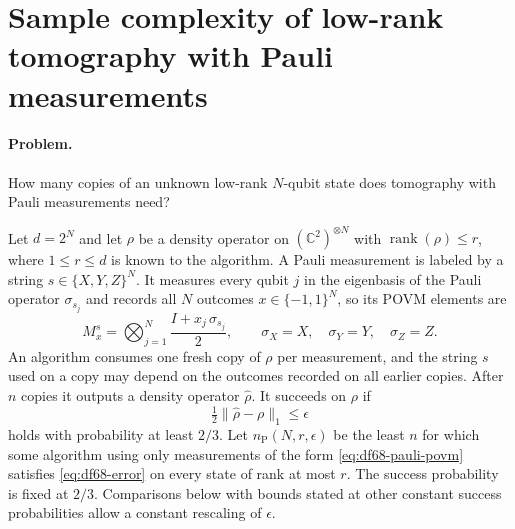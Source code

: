 \section{Sample complexity of low-rank tomography with Pauli measurements}
\label{sec:op_df689759a5203415}

\paragraph{Problem.}
How many copies of an unknown low-rank $N$-qubit state does tomography with Pauli measurements need?

Let $d=2^N$ and let $\rho$ be a density operator on $(\mathbb{C}^2)^{\otimes N}$ with $\operatorname{rank}(\rho)\leq r$, where $1\leq r\leq d$ is known to the algorithm. A Pauli measurement is labeled by a string $s\in\{X,Y,Z\}^N$. It measures every qubit $j$ in the eigenbasis of the Pauli operator $\sigma_{s_j}$ and records all $N$ outcomes $x\in\{-1,1\}^N$, so its POVM elements are
\begin{equation}
  M^{s}_{x}=\bigotimes_{j=1}^{N}\frac{I+x_j\,\sigma_{s_j}}{2},
  \qquad
  \sigma_X=X,\quad\sigma_Y=Y,\quad\sigma_Z=Z.
  \label{eq:df68-pauli-povm}
\end{equation}
An algorithm consumes one fresh copy of $\rho$ per measurement, and the string $s$ used on a copy may depend on the outcomes recorded on all earlier copies. After $n$ copies it outputs a density operator $\hat\rho$. It succeeds on $\rho$ if
\begin{equation}
  \tfrac12\lVert\hat\rho-\rho\rVert_1\leq\epsilon
  \label{eq:df68-error}
\end{equation}
holds with probability at least $2/3$. Let $n_{\mathrm{P}}(N,r,\epsilon)$ be the least $n$ for which some algorithm using only measurements of the form \eqref{eq:df68-pauli-povm} satisfies \eqref{eq:df68-error} on every state of rank at most $r$. The success probability is fixed at $2/3$. Comparisons below with bounds stated at other constant success probabilities allow a constant rescaling of $\epsilon$.

